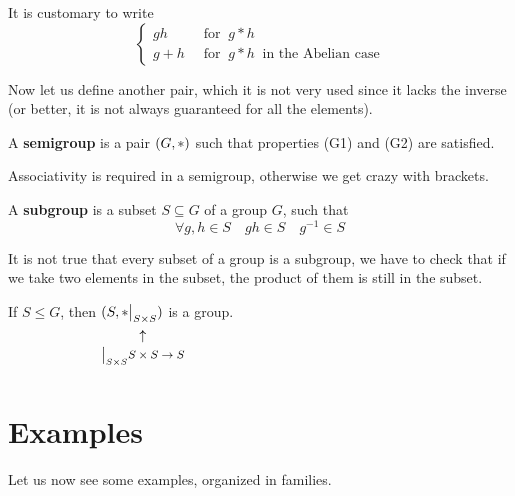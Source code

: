 \documentclass[../main.tex]{subfiles}
\begin{document}
\begin{kaobox}[frametitle=Notation]
It is customary to write
\[
\begin{cases}
gh \ &\textrm{ for } \ g\ast h\\
g+h \ &\textrm{ for } \ g\ast h \ \textrm{ in the Abelian case}
\end{cases}
\]
\end{kaobox}
Now let us define another pair, which it is not very used since it lacks the inverse (or better, it is not always guaranteed for all the elements). 
\begin{definition}[Semigroup]
A \textbf{semigroup} is a pair \(\pqty{G,\ast}\) such that properties (G1) and (G2) are satisfied.
\end{definition}
Associativity is required in a semigroup, otherwise we get crazy with brackets.
\begin{definition}
A \textbf{subgroup} is a subset $S \subseteq G$ of a group $G$, such that
\[
\forall  g,h \in S \quad gh\in S \quad g^{-1}\in S
\]
\end{definition}
It is not true that every subset of a group is a subgroup, we have to check that if we take two elements in the subset, the product of them is still in the subset.
\begin{kaobox}[frametitle=Remark]
If $S\leq G$, then $(S,\ast \underset{\mathclap{\tikz \node {$\uparrow$} node [below=1ex]{\footnotesize $\big|_{S\times S}S\times S \to S$ };}}{\big|_{S\times S}})$ is a group.
\end{kaobox}
\section{Examples}
Let us now see some examples, organized in families.
\end{document}
